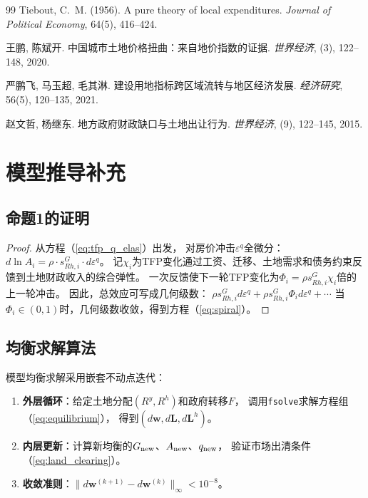 \documentclass[UTF8,a4paper,12pt]{ctexart}
\theoremstyle{plain}
\theoremstyle{definition}
\theoremstyle{remark}
\newcommand{\Ry}{R^{y}}
\newcommand{\Rh}{R^{h}}
\begin{document}
\begin{thebibliography}{99}
Tiebout, C.~M. (1956).
A pure theory of local expenditures.
\textit{Journal of Political Economy}, 64(5), 416--424.

王鹏, 陈斌开.
中国城市土地价格扭曲：来自地价指数的证据.
\textit{世界经济}, (3), 122--148, 2020.

严鹏飞, 马玉超, 毛其淋.
建设用地指标跨区域流转与地区经济发展.
\textit{经济研究}, 56(5), 120--135, 2021.

赵文哲, 杨继东.
地方政府财政缺口与土地出让行为.
\textit{世界经济}, (9), 122--145, 2015.

\end{thebibliography}

\appendix
\section{模型推导补充}

\subsection{命题1的证明}

\begin{proof}
从方程（\ref{eq:tfp_q_elas}）出发，
对房价冲击$\varepsilon^q$全微分：
$d\ln A_i = \rho\cdot s^G_{Rh,i}\cdot d\varepsilon^q$。
记$\chi_i$为TFP变化通过工资、迁移、土地需求和债务约束反馈到土地财政收入的综合弹性。
一次反馈使下一轮TFP变化为$\Phi_i=\rho s^G_{Rh,i}\chi_i$倍的上一轮冲击。
因此，总效应可写成几何级数：
$\rho s^G_{Rh,i}d\varepsilon^q + \rho s^G_{Rh,i}\Phi_i d\varepsilon^q + \cdots$
当$\Phi_i\in(0,1)$时，几何级数收敛，得到方程（\ref{eq:spiral}）。
\end{proof}

\subsection{均衡求解算法}

模型均衡求解采用嵌套不动点迭代：
\begin{enumerate}[leftmargin=2em]
\item \textbf{外层循环}：给定土地分配$(\Ry,\Rh)$和政府转移$F$，
  调用\texttt{fsolve}求解方程组（\ref{eq:equilibrium}），
  得到$(d\bm{w},d\bm{L},d\bm{L}^h)$。
\item \textbf{内层更新}：计算新均衡的$G_{\rm new}$、$A_{\rm new}$、$q_{\rm new}$，
  验证市场出清条件（\ref{eq:land_clearing}）。
\item \textbf{收敛准则}：$\|d\bm{w}^{(k+1)}-d\bm{w}^{(k)}\|_\infty < 10^{-8}$。
\end{enumerate}
\end{document}
